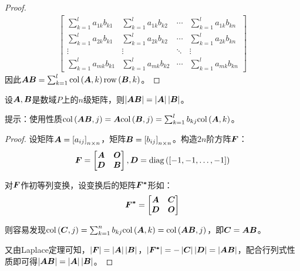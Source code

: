 \begin{proof}
\begin{align*}
\begin{bmatrix}
            \sum_{k=1}^la_{1k}b_{k1} & \sum_{k=1}^la_{1k}b_{k2} & \cdots & \sum_{k=1}^la_{1k}b_{kn} \\
            \sum_{k=1}^la_{2k}b_{k1} & \sum_{k=1}^la_{2k}b_{k2} & \cdots & \sum_{k=1}^la_{2k}b_{kn} \\
            \vdots                   & \vdots                   & \ddots & \vdots                   \\
            \sum_{k=1}^la_{mk}b_{k1} & \sum_{k=1}^la_{mk}b_{k2} & \cdots & \sum_{k=1}^la_{mk}b_{kn}
        \end{bmatrix}
    \end{align*}
    因此\(\boldsymbol{A}\boldsymbol{B}=\sum_{k=1}^l\mathrm{col}\left( \boldsymbol{A},k \right)\mathrm{row}\left( \boldsymbol{B},k \right)\)。
\end{proof}

\begin{extraprob}
    设\(\boldsymbol{A},\boldsymbol{B}\)是数域\(P\)上的\(n\)级矩阵，则\(\left|\boldsymbol{A}\boldsymbol{B} \right|=\left|\boldsymbol{A} \right|\left|\boldsymbol{B} \right|\)。

    提示：使用性质\(\mathrm{col}\left( \boldsymbol{A}\boldsymbol{B},j \right)=\boldsymbol{A}\mathrm{col}\left( \boldsymbol{B},j \right)=\sum_{k=1}^lb_{kj}\mathrm{col}\left( \boldsymbol{A},k \right)\)。
\end{extraprob}
\begin{proof}
    设矩阵\(\boldsymbol{A}=\left[ a_{ij} \right]_{n\times n}\)，矩阵\(\boldsymbol{B}=\left[ b_{ij} \right]_{n\times n}\)。构造\(2n\)阶方阵\(\boldsymbol{F}\)：
    \begin{equation*}
        \boldsymbol{F}=
        \begin{bmatrix}
            \boldsymbol{A} & \boldsymbol{O} \\\boldsymbol{D}&\boldsymbol{B}
        \end{bmatrix},\boldsymbol{D}=\mathrm{diag}\left( \left[ -1,-1,\dots,-1 \right] \right)
    \end{equation*}

    对\(\boldsymbol{F}\)作初等列变换，设变换后的矩阵\(\boldsymbol{F^*}\)形如：
    \begin{equation*}
        \boldsymbol{F^*}=\begin{bmatrix}\boldsymbol{A}&\boldsymbol{C}\\\boldsymbol{D}&\boldsymbol{O}\end{bmatrix}
    \end{equation*}

    则容易发现\(\mathrm{col}\left( \boldsymbol{C},j \right)=\sum_{k=1}^nb_{kj}\mathrm{col}\left( \boldsymbol{A},k \right)=\mathrm{col}\left( \boldsymbol{A}\boldsymbol{B},j \right)\)，即\(\boldsymbol{C}=\boldsymbol{A}\boldsymbol{B}\)。

    又由Laplace定理可知，\(\left|\boldsymbol{F} \right|=\left|\boldsymbol{A} \right|\left|\boldsymbol{B} \right|\)，\(\left|\boldsymbol{F^*} \right|=-\left|\boldsymbol{C} \right|\left|\boldsymbol{D} \right|=\left|\boldsymbol{A}\boldsymbol{B} \right|\)，配合行列式性质即可得\(\left|\boldsymbol{A}\boldsymbol{B} \right|=\left|\boldsymbol{A} \right|\left|\boldsymbol{B} \right|\)。

\end{proof}

